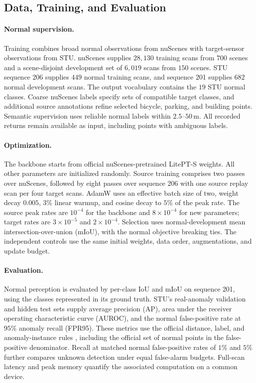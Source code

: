 \documentclass{article}
\begin{document}
\subsection{Data, Training, and Evaluation}
\paragraph{Normal supervision.}
Training combines broad normal observations from nuScenes with target-sensor observations from STU. nuScenes \citep{nuscenes} supplies $28{,}130$ training scans from $700$ scenes and a scene-disjoint development set of $6{,}019$ scans from $150$ scenes. STU sequence 206 supplies $449$ normal training scans, and sequence 201 supplies $682$ normal development scans. The output vocabulary contains the $19$ STU normal classes. Coarse nuScenes labels specify sets of compatible target classes, and additional source annotations refine selected bicycle, parking, and building points. Semantic supervision uses reliable normal labels within $2.5$--$50$\,m. All recorded returns remain available as input, including points with ambiguous labels.

\paragraph{Optimization.}
The backbone starts from official nuScenes-pretrained LitePT-S weights. All other parameters are initialized randomly. Source training comprises two passes over nuScenes, followed by eight passes over sequence 206 with one source replay scan per four target scans. AdamW uses an effective batch size of two, weight decay $0.005$, $3\%$ linear warmup, and cosine decay to $5\%$ of the peak rate. The source peak rates are $10^{-4}$ for the backbone and $8\times10^{-4}$ for new parameters; target rates are $3\times10^{-5}$ and $2\times10^{-4}$. Selection uses normal-development mean intersection-over-union (mIoU), with the normal objective breaking ties. The independent controls use the same initial weights, data order, augmentations, and update budget.

\paragraph{Evaluation.}
Normal perception is evaluated by per-class IoU and mIoU on sequence 201, using the classes represented in its ground truth. STU's real-anomaly validation and hidden test sets supply average precision (AP), area under the receiver operating characteristic curve (AUROC), and the normal false-positive rate at $95\%$ anomaly recall (FPR95). These metrics use the official distance, label, and anomaly-instance rules \citep{stu}, including the official set of normal points in the false-positive denominator. Recall at matched normal false-positive rates of $1\%$ and $5\%$ further compares unknown detection under equal false-alarm budgets. Full-scan latency and peak memory quantify the associated computation on a common device.
\end{document}
